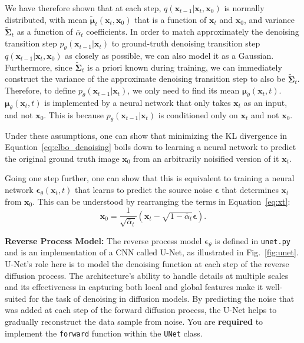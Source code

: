 \documentclass[11pt,addpoints,answers]{exam}
\newcommand{\xv}{\mathbf{x}}
\newcommand{\epsilonv   }{\boldsymbol \epsilon   }
\newcommand{\muv        }{\boldsymbol \mu        }
\begin{document}
\begin{questions}
    We have therefore shown that at each step, 
 $q(\xv_{t-1} | \xv_t, \xv_0)$ is normally distributed, with mean $\tilde{\muv}_t(\xv_t, \xv_0)$
 that is a function of $\xv_t$ and $\xv_0$, and variance $\tilde{\boldsymbol{\Sigma}}_t$ as a function of $\bar\alpha_{t}$ coefficients. In order to match approximately the denoising transition step $p_\theta(\xv_{t-1}|\xv_t)$
 to ground-truth denoising transition step $q(\xv_{t-1} | \xv_t, \xv_0)$
 as closely as possible, we can also model it as a Gaussian. Furthermore, since $\tilde{\boldsymbol{\Sigma}}_t$ is a priori known during training, we can immediately construct the variance of the approximate denoising transition step to also be 
$\tilde{\boldsymbol{\Sigma}}_t$. Therefore, to define $p_\theta(\xv_{t-1}|\xv_t)$, we only need to find its mean $\boldsymbol{\mu}_\theta(\xv_t, t)$. $\boldsymbol{\mu}_\theta(\xv_t, t)$ is implemented by a neural network that only takes $\xv_t$ as an input, and not $\xv_0$. This is because $p_\theta(\xv_{t-1}|\xv_t)$ is conditioned only on $\xv_t$ and not $\xv_0$.
    \par
Under these assumptions, one can show that minimizing the KL divergence in Equation~\ref{eq:elbo_denoising} boils down to learning a neural network to predict the original ground truth image $\xv_0$ from an arbitrarily noisified version of it $\xv_t$. 

Going one step further, one can show that this is equivalent to training a neural network $\boldsymbol{\epsilon}_\theta(\xv_t,t)$ that learns to predict the source noise $\boldsymbol{\epsilon}$
 that determines $\xv_t$
 from $\xv_0$. This can be understood by rearranging the terms in Equation~\ref{eq:xt}: 
\begin{equation}
        \xv_0 = \frac{1}{\sqrt{\bar{\alpha}_t}} \left( \xv_t - \sqrt{1 - \bar{\alpha}_t} \epsilonv \right).
\end{equation}

    \textbf{Reverse Process Model:} The reverse process model $\boldsymbol{\epsilon}_\theta$ is defined in \lstinline{unet.py} and is an implementation of a CNN called U-Net, as illustrated in Fig.~\ref{fig:unet}. 
    U-Net's role here is to model the denoising function at each step of the reverse diffusion process. The architecture's ability to handle details at multiple scales and its effectiveness in capturing both local and global features make it well-suited for the task of denoising in diffusion models. By predicting the noise that was added at each step of the forward diffusion process, the U-Net helps to gradually reconstruct the data sample from noise. You are \textbf{required} to implement the \lstinline{forward} function  within the \lstinline{UNet} class.
    

\end{questions}
\end{document}
